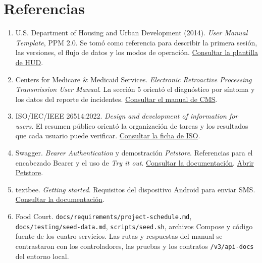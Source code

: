 \documentclass[11pt,a4paper]{article}
\newcommand{\code}[1]{\nolinkurl{#1}}
\begin{document}
\section{Referencias}\label{sec:referencias}
\begin{enumerate}
\item U.S. Department of Housing and Urban Development (2014). \emph{User Manual Template}, PPM 2.0. Se tomó como referencia para describir la primera sesión, las versiones, el flujo de datos y los modos de operación. \href{https://www.hud.gov/sites/documents/user_man.pdf}{Consultar la plantilla de HUD}.
\item Centers for Medicare \& Medicaid Services. \emph{Electronic Retroactive Processing Transmission User Manual}. La sección 5 orientó el diagnóstico por síntoma y los datos del reporte de incidentes. \href{https://www.cms.gov/research-statistics-data-and-systems/cms-information-technology/mapdhelpdesk/downloads/electronic-retroactive-processing-transmission-erpt-user-manual-v19.pdf}{Consultar el manual de CMS}.
\item ISO/IEC/IEEE 26514:2022. \emph{Design and development of information for users}. El resumen público orientó la organización de tareas y los resultados que cada usuario puede verificar. \href{https://www.iso.org/standard/77451.html}{Consultar la ficha de ISO}.
\item Swagger. \emph{Bearer Authentication} y demostración \emph{Petstore}. Referencias para el encabezado Bearer y el uso de \emph{Try it out}. \href{https://swagger.io/docs/specification/v3_0/authentication/bearer-authentication/}{Consultar la documentación}. \href{https://petstore.swagger.io/?displayOperationId=1}{Abrir Petstore}.
\item textbee. \emph{Getting started}. Requisitos del dispositivo Android para enviar SMS. \href{https://textbee.dev/docs/getting-started}{Consultar la documentación}.
\item Food Court. \code{docs/requirements/project-schedule.md}, \code{docs/testing/seed-data.md}, \code{scripts/seed.sh}, archivos Compose y código fuente de los cuatro servicios. Las rutas y respuestas del manual se contrastaron con los controladores, las pruebas y los contratos \code{/v3/api-docs} del entorno local.
\end{enumerate}

\clearpage
\appendix
\end{document}
